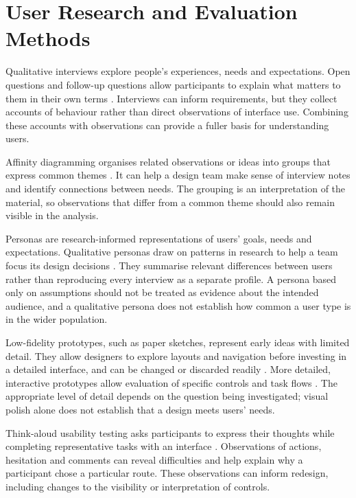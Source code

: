 \section{User Research and Evaluation Methods}
\label{sec:research-evaluation}

Qualitative interviews explore people's experiences, needs and expectations.
Open questions and follow-up questions allow participants to explain what
matters to them in their own terms \cite{rosalainterviews}. Interviews can
inform requirements, but they collect accounts of behaviour rather than
direct observations of interface use. Combining these accounts with
observations can provide a fuller basis for understanding users.

Affinity diagramming organises related observations or ideas into groups
that express common themes \cite[Sec.~``Defining Affinity
Diagramming'']{krauseaffinity}. It can help a design team make sense of
interview notes and identify connections between needs. The grouping is an
interpretation of the material, so observations that differ from a common
theme should also remain visible in the analysis.

Personas are research-informed representations of users' goals, needs and
expectations. Qualitative personas draw on patterns in research to help a
team focus its design decisions \cite{laubheimerpersonas}. They summarise
relevant differences between users rather than reproducing every interview
as a separate profile. A persona based only on assumptions should not be
treated as evidence about the intended audience, and a qualitative persona
does not establish how common a user type is in the wider population.

Low-fidelity prototypes, such as paper sketches, represent early ideas with
limited detail. They allow designers to explore layouts and navigation before
investing in a detailed interface, and can be changed or discarded readily
\cite[Sec.~``Benefits of Low-Fidelity Prototypes'']{perniceprototypes}.
More detailed, interactive prototypes allow evaluation of specific controls
and task flows \cite[Sec.~``Benefits of High-Fidelity
Prototypes'']{perniceprototypes}. The appropriate level of detail depends on
the question being investigated; visual polish alone does not establish that
a design meets users' needs.

Think-aloud usability testing asks participants to express their thoughts
while completing representative tasks with an interface
\cite[Sec.~``Defining Thinking Aloud Testing'']{nielsenthinkaloud}.
Observations of actions, hesitation and comments can reveal difficulties and
help explain why a participant chose a particular route. These observations
can inform redesign, including changes to the visibility or interpretation
of controls.

